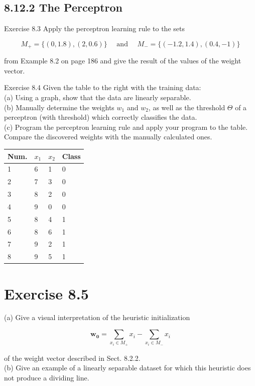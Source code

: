 \documentclass[10pt]{book}
\begin{document}
\begin{center}
\begin{enumerate}
\begin{center}
\begin{center}
\begin{center}
\subsection*{8.12.2 The Perceptron}
Exercise 8.3 Apply the perceptron learning rule to the sets


$$
M_{+}=\{(0,1.8),(2,0.6)\} \quad \text { and } \quad M_{-}=\{(-1.2,1.4),(0.4,-1)\}
$$

from Example 8.2 on page 186 and give the result of the values of the weight vector.

Exercise 8.4 Given the table to the right with the training data:\\
(a) Using a graph, show that the data are linearly separable.\\
(b) Manually determine the weights $w_{1}$ and $w_{2}$, as well as the threshold $\Theta$ of a perceptron (with threshold) which correctly classifies the data.\\
(c) Program the perceptron learning rule and apply your program to the table. Compare the discovered weights with the manually calculated ones.

\begin{center}
\begin{tabular}{llll}
\hline
Num. & $x_{1}$ & $x_{2}$ & Class \\
\hline
1 & 6 & 1 & 0 \\
\hline
2 & 7 & 3 & 0 \\
\hline
3 & 8 & 2 & 0 \\
\hline
4 & 9 & 0 & 0 \\
\hline
5 & 8 & 4 & 1 \\
\hline
6 & 8 & 6 & 1 \\
\hline
7 & 9 & 2 & 1 \\
\hline
8 & 9 & 5 & 1 \\
\hline
\end{tabular}
\end{center}

\section*{Exercise 8.5}
(a) Give a visual interpretation of the heuristic initialization

$$
\boldsymbol{w}_{\mathbf{0}}=\sum_{x_{i} \in M_{+}} x_{i}-\sum_{x_{i} \in M_{-}} x_{i}
$$

of the weight vector described in Sect. 8.2.2.\\
(b) Give an example of a linearly separable dataset for which this heuristic does not produce a dividing line.


\end{center}
\end{center}
\end{center}
\end{enumerate}
\end{center}
\end{document}
